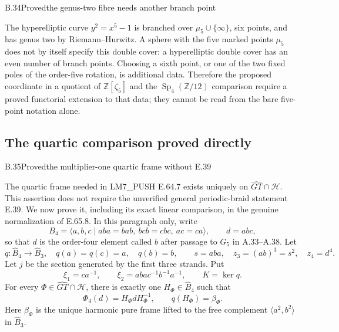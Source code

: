 \begin{statement}{B.34}{Proved}{the genus-two fibre needs another branch point}
\end{statement}
The hyperelliptic curve $y^2=x^5-1$ is branched over
$\mu_5\cup\{\infty\}$, six points, and has genus two by
Riemann--Hurwitz. A sphere with the five marked points $\mu_5$ does not by
itself specify this double cover: a hyperelliptic double cover has an even
number of branch points. Choosing a sixth point, or one of the two fixed
poles of the order-five rotation, is additional data. Therefore the
proposed coordinate in a quotient of $\mathbb Z[\zeta_5]$ and the
$\operatorname{Sp}_4(\mathbb Z/12)$ comparison require a proved
functorial extension to that data; they cannot be read from the bare
five-point notation alone.

\subsection{The quartic comparison proved directly}


\begin{statement}{B.35}{Proved}{the multiplier-one quartic frame without E.39}
\citep[Theorem B$^{\prime}$]{HerfortRibes1985}
\end{statement}
The quartic frame needed in LM7\_PUSH E.64.7 exists uniquely on
$\widehat{GT}\cap\mathcal H$. This assertion does not require the
unverified general periodic-braid statement E.39. We now prove it,
including its exact linear comparison, in the genuine normalization of
E.65.8. In this paragraph only, write
\[
 B_4=\langle a,b,c\mid aba=bab,\ bcb=cbc,\ ac=ca\rangle,
 \qquad d=abc,
\]
so that $d$ is the order-four element called $b$ after passage to $G_5$
in A.33--A.38. Let
\[
 q:\widehat B_4\longrightarrow\widehat B_3,
 \quad q(a)=q(c)=a,\quad q(b)=b,\qquad
 s=aba,\quad z_3=(ab)^3=s^2,\quad z_4=d^4.
\]
Let $j$ be the section generated by the first three strands. Put
\[
 \xi_1=ca^{-1},\qquad
 \xi_2=aba c^{-1}b^{-1}a^{-1},\qquad K=\ker q.
\]
For every $\Phi\in\widehat{GT}\cap\mathcal H$, there is exactly one
$H_\Phi\in\widehat B_4$ such that
\[
 \Phi_4(d)=H_\Phi dH_\Phi^{-1},\qquad q(H_\Phi)=\beta_\Phi.
 \tag{FP.26.1}
\]
Here $\beta_\Phi$ is the unique harmonic pure frame lifted to the free
complement $\langle a^2,b^2\rangle$ in $\widehat B_3$.


